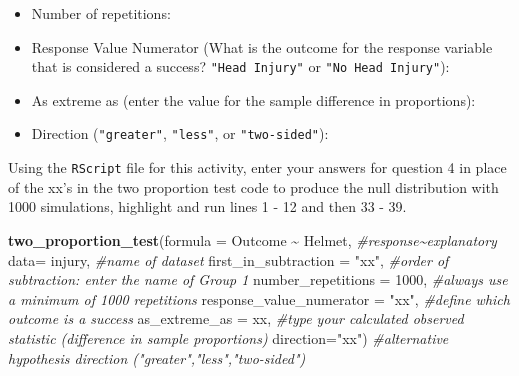 \documentclass[
]{report}
\newenvironment{Shaded}{\begin{snugshade}}{\end{snugshade}}
\newcommand{\CommentTok}[1]{\textcolor[rgb]{0.56,0.35,0.01}{\textit{#1}}}
\newcommand{\DataTypeTok}[1]{\textcolor[rgb]{0.13,0.29,0.53}{#1}}
\newcommand{\DecValTok}[1]{\textcolor[rgb]{0.00,0.00,0.81}{#1}}
\newcommand{\KeywordTok}[1]{\textcolor[rgb]{0.13,0.29,0.53}{\textbf{#1}}}
\newcommand{\NormalTok}[1]{#1}
\newcommand{\OperatorTok}[1]{\textcolor[rgb]{0.81,0.36,0.00}{\textbf{#1}}}
\newcommand{\StringTok}[1]{\textcolor[rgb]{0.31,0.60,0.02}{#1}}
\providecommand{\tightlist}{%
  \setlength{\itemsep}{0pt}\setlength{\parskip}{0pt}}
\begin{document}
\vspace{.2in}

\begin{itemize}
\tightlist
\item
  Number of repetitions:
\end{itemize}

\vspace{.2in}

\begin{itemize}
\tightlist
\item
  Response Value Numerator (What is the outcome for the response variable that is considered a success? \texttt{"Head\ Injury"} or \texttt{"No\ Head\ Injury"}):
\end{itemize}

\vspace{.2in}

\begin{itemize}
\tightlist
\item
  As extreme as (enter the value for the sample difference in proportions):
\end{itemize}

\vspace{.2in}

\begin{itemize}
\tightlist
\item
  Direction (\texttt{"greater"}, \texttt{"less"}, or \texttt{"two-sided"}):
\end{itemize}

\vspace{.2in}

Using the \texttt{RScript} file for this activity, enter your answers for question 4 in place of the xx's in the two proportion test code to produce the null distribution with 1000 simulations, highlight and run lines 1 - 12 and then 33 - 39.

\begin{Shaded}
\begin{Highlighting}[]
\KeywordTok{two\_proportion\_test}\NormalTok{(}\DataTypeTok{formula =}\NormalTok{ Outcome }\OperatorTok{\textasciitilde{}}\StringTok{ }\NormalTok{Helmet, }\CommentTok{\#response\textasciitilde{}explanatory}
                    \DataTypeTok{data=}\NormalTok{ injury, }\CommentTok{\#name of dataset}
                    \DataTypeTok{first\_in\_subtraction =} \StringTok{"xx"}\NormalTok{, }\CommentTok{\#order of subtraction: enter the name of Group 1}
                    \DataTypeTok{number\_repetitions =} \DecValTok{1000}\NormalTok{, }\CommentTok{\#always use a minimum of 1000 repetitions}
                    \DataTypeTok{response\_value\_numerator =} \StringTok{"xx"}\NormalTok{, }\CommentTok{\#define which outcome is a success }
                    \DataTypeTok{as\_extreme\_as =}\NormalTok{ xx, }\CommentTok{\#type your calculated observed statistic (difference in sample proportions)}
                    \DataTypeTok{direction=}\StringTok{"xx"}\NormalTok{) }\CommentTok{\#alternative hypothesis direction ("greater","less","two{-}sided")}
\end{Highlighting}
\end{Shaded}
\end{document}
